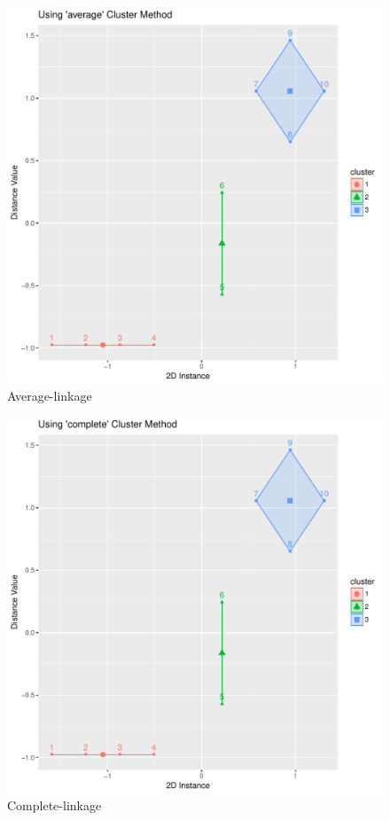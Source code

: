 \documentclass[letterpaper,11pt]{article}
\begin{document}
\begin{figure}[h]
\centering
\includegraphics[scale=0.45]{average.pdf}
\caption{Average-linkage}
\label{fig:2}
\end{figure}

\begin{figure}[h]
\centering
\includegraphics[scale=0.45]{complete.pdf}
\caption{Complete-linkage}
\label{fig:3}
\end{figure}
\end{document}
